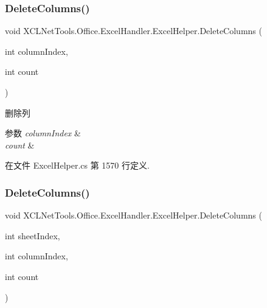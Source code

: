 \subsubsection{\texorpdfstring{Delete\+Columns()}{DeleteColumns()}\hspace{0.1cm}{\footnotesize\ttfamily [1/2]}}
{\footnotesize\ttfamily void X\+C\+L\+Net\+Tools.\+Office.\+Excel\+Handler.\+Excel\+Helper.\+Delete\+Columns (\begin{DoxyParamCaption}\item[{int}]{column\+Index,  }\item[{int}]{count }\end{DoxyParamCaption})}



删除列 


\begin{DoxyParams}{参数}
{\em column\+Index} & \\
\hline
{\em count} & \\
\hline
\end{DoxyParams}


在文件 Excel\+Helper.\+cs 第 1570 行定义.

\mbox{\label{class_x_c_l_net_tools_1_1_office_1_1_excel_handler_1_1_excel_helper_ace21012f5684de3daa81e9869ddf2183}} 
\subsubsection{\texorpdfstring{Delete\+Columns()}{DeleteColumns()}\hspace{0.1cm}{\footnotesize\ttfamily [2/2]}}
{\footnotesize\ttfamily void X\+C\+L\+Net\+Tools.\+Office.\+Excel\+Handler.\+Excel\+Helper.\+Delete\+Columns (\begin{DoxyParamCaption}\item[{int}]{sheet\+Index,  }\item[{int}]{column\+Index,  }\item[{int}]{count }\end{DoxyParamCaption})}



